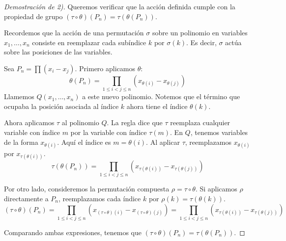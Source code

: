\begin{proof}[Demostración de 2)]
    Queremos verificar que la acción definida cumple con la propiedad de grupo $(\tau \circ \theta)(P_n) = \tau(\theta(P_n))$.
    
    Recordemos que la acción de una permutación $\sigma$ sobre un polinomio en variables $x_1, \dots, x_n$ consiste en reemplazar cada subíndice $k$ por $\sigma(k)$. Es decir, $\sigma$ actúa sobre las posiciones de las variables.
    
    Sea $P_n = \prod (x_i - x_j)$.
    Primero aplicamos $\theta$:
    \begin{equation*}
        \theta(P_n) = \prod_{1 \leq i < j \leq n} (x_{\theta(i)} - x_{\theta(j)})
    \end{equation*}
    Llamemos $Q(x_1, \dots, x_n)$ a este nuevo polinomio. Notemos que el término que ocupaba la posición asociada al índice $k$ ahora tiene el índice $\theta(k)$.
    
    Ahora aplicamos $\tau$ al polinomio $Q$. La regla dice que $\tau$ reemplaza cualquier variable con índice $m$ por la variable con índice $\tau(m)$.
    En $Q$, tenemos variables de la forma $x_{\theta(i)}$. Aquí el índice es $m = \theta(i)$.
    Al aplicar $\tau$, reemplazamos $x_{\theta(i)}$ por $x_{\tau(\theta(i))}$.
    \begin{equation*}
        \tau(\theta(P_n)) = \prod_{1 \leq i < j \leq n} (x_{\tau(\theta(i))} - x_{\tau(\theta(j))})
    \end{equation*}
    
    Por otro lado, consideremos la permutación compuesta $\rho = \tau \circ \theta$.
    Si aplicamos $\rho$ directamente a $P_n$, reemplazamos cada índice $k$ por $\rho(k) = \tau(\theta(k))$.
    \begin{equation*}
        (\tau \circ \theta)(P_n) = \prod_{1 \leq i < j \leq n} (x_{(\tau \circ \theta)(i)} - x_{(\tau \circ \theta)(j)}) = \prod_{1 \leq i < j \leq n} (x_{\tau(\theta(i))} - x_{\tau(\theta(j))})
    \end{equation*}
    
    Comparando ambas expresiones, tenemos que $(\tau \circ \theta)(P_n) = \tau(\theta(P_n))$.
\end{proof}

